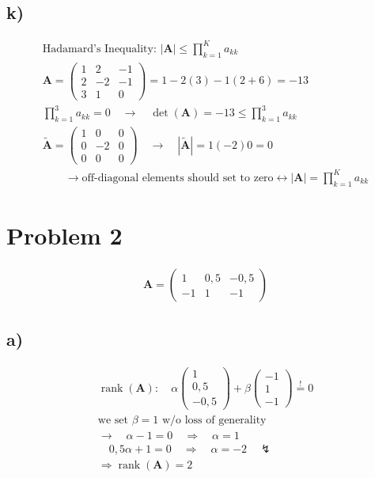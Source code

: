 \documentclass[fleqn]{article}
\DeclareMathOperator{\rank}{rank}
\begin{document}
\subsection*{k)}
\begin{align*}
	&\text{Hadamard's Inequality: }\left|\mathbf{A}\right|\le\prod_{k=1}^{K}a_{kk}& \\
	&\mathbf{A}=
	\begin{pmatrix}
	1 & 2 & -1 \\
	2 & -2 & -1 \\
	3 & 1 & 0
	\end{pmatrix}=1-2\left(3\right)-1\left(2+6\right)=-13& \\
	&\prod_{k=1}^{3}a_{kk}=0\quad\rightarrow\quad\det\left(\mathbf{A}\right)=-13\le\prod_{k=1}^{3}a_{kk}& \\
	&\tilde{\mathbf{A}}=
	\begin{pmatrix}
	1 & 0 & 0 \\
	0 & -2 & 0 \\
	0 & 0 & 0
	\end{pmatrix}\quad\rightarrow\quad\left|\tilde{\mathbf{A}}\right|=1\left(-2\right)0=0& \\
	&\qquad\rightarrow\text{off-diagonal elements should set to zero}\leftrightarrow\left|\mathbf{A}\right|=\prod_{k=1}^{K}a_{kk}&
\end{align*}

\section*{Problem 2}
\begin{align*}
	\mathbf{A}=
	\begin{pmatrix}
	1 & 0,5 & -0,5 \\
	-1 & 1 & -1
	\end{pmatrix}
\end{align*}

\subsection*{a)}
\begin{align*}
	&\rank\left(\mathbf{A}\right):\quad\alpha\begin{pmatrix}1\\0,5\\-0,5\end{pmatrix}+\beta\begin{pmatrix}-1\\1\\-1\end{pmatrix}\overset{!}{=}0& \\
	&\text{we set $\beta=1$ w/o loss of generality}& \\
	&\rightarrow\quad\alpha-1=0\quad\Rightarrow\quad\alpha=1& \\
	&\quad 0,5\alpha+1=0\quad\Rightarrow\quad\alpha=-2\quad\lightning& \\
	&\Rightarrow\rank\left(\mathbf{A}\right)=2&
\end{align*}
\end{document}
